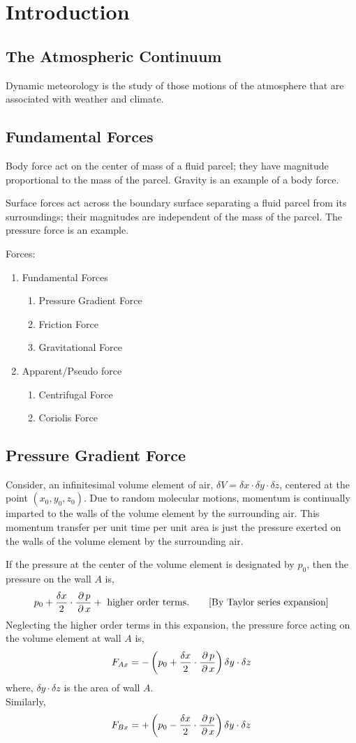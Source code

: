 \documentclass[../main-sheet.tex]{subfiles}
\begin{document}
\chapter{Introduction}
\section{The Atmospheric Continuum}
Dynamic meteorology is the study of those motions of the atmosphere that are associated with weather and climate.
\section{Fundamental Forces}
Body force act on the center of mass of a fluid parcel; they have magnitude proportional to the mass of the parcel. Gravity is an example of a body force.

Surface forces act across the boundary surface separating a fluid parcel from its surroundings; their magnitudes are independent of the mass of the parcel. The pressure force is an example.


Forces:
\begin{enumerate}
    \item Fundamental Forces
    \begin{enumerate}
        \item Pressure Gradient Force
        \item Friction Force
        \item Gravitational Force
    \end{enumerate}
    \item Apparent/Pseudo force 
    \begin{enumerate}
        \item Centrifugal Force
        \item Coriolis Force
    \end{enumerate}
\end{enumerate}
\section{Pressure Gradient Force}
Consider, an infinitesimal volume element of air, \(\delta V=\delta x\cdot\delta y\cdot\delta z\), centered at the point \((x_0,y_0,z_0)\). Due to random molecular motions, momentum is continually imparted to the walls of the volume element by the surrounding air. This momentum transfer per unit time per unit area is just the pressure exerted on the walls of the volume element by the surrounding air.

If the pressure at the center of the volume element is designated by \(p_0\), then the pressure on the wall \(A \) is,
\[p_0+\frac{\delta x}{2}\cdot\frac{\,\partial\, p }{\,\partial\, x}+\text{ higher order terms.}\qquad[\text{By Taylor series expansion}]\]
Neglecting the higher order terms in this expansion, the pressure force acting on the volume element at wall \(A \) is,
\[F_{Ax}=-\left( p_0+\frac{\delta x}{2}\cdot\frac{\,\partial\, p }{\,\partial\, x} \right)\delta y\cdot\delta z\]
where, \(\delta y\cdot\delta z\) is the area of wall \(A\).\\
Similarly,
\[F_{Bx}=+\left( p_0-\frac{\delta x}{2}\cdot\frac{\,\partial\, p }{\,\partial\, x} \right)\delta y\cdot\delta z\]
\end{document}
